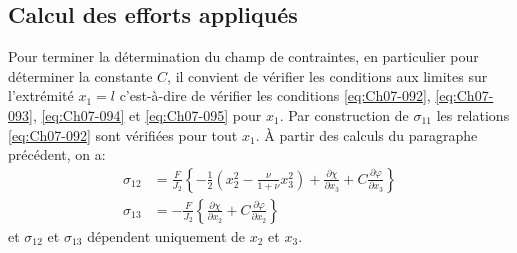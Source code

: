 \subsection{Calcul des efforts appliqués} \label{ssec:Ch07-3.2}
Pour terminer la détermination du champ de contraintes, en particulier pour déterminer la constante $C$, il convient de vérifier les conditions aux limites sur l'extrémité $x_1 = l$ c'est-à-dire de vérifier les conditions \eqref{eq:Ch07-092}, \eqref{eq:Ch07-093}, \eqref{eq:Ch07-094} et \eqref{eq:Ch07-095} pour $x_1$.
Par construction de $\sigma_{11}$ les relations \eqref{eq:Ch07-092} sont 
vérifiées pour tout $x_1$.
À partir des calculs du paragraphe précédent, on a:
\begin{equation}
    \begin{aligned}
        \sigma_{12} &= \frac{F}{J_2} \left\{ -\frac{1}{2} \left( x_2^2 - \frac{\nu}{1+\nu} x_3^2 \right) + \frac{\partial \chi}{\partial x_3} + C \frac{\partial \varphi}{\partial x_3} \right\} \\
        \sigma_{13} &= - \frac{F}{J_2} \left\{ \frac{\partial \chi}{\partial x_2} + C \frac{\partial \varphi}{\partial x_2} \right\}
    \end{aligned}
    \label{eq:Ch07-109}
\end{equation}
et $\sigma_{12}$ et $\sigma_{13}$ dépendent uniquement de $x_2$ et $x_3$.

